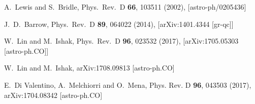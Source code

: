 \documentclass[superscriptaddress,oneolumn,secnumarabic,
amssymb,amsmath,nobibnotes,aps,prd,showpacs,nofootinbib]{revtex4}%
\begin{document}
\begin{thebibliography}{*}
  A.~Lewis and S.~Bridle,
  Phys.\ Rev.\ D {\bf 66}, 103511 (2002),
  [astro-ph/0205436]

  J.~D.~Barrow,
  Phys.\ Rev.\ D {\bf 89}, 064022 (2014),
  [arXiv:1401.4344 [gr-qc]]


  W.~Lin and M.~Ishak,
  Phys.\ Rev.\ D {\bf 96}, 023532 (2017),
  [arXiv:1705.05303 [astro-ph.CO]]



  W.~Lin and M.~Ishak,
  arXiv:1708.09813 [astro-ph.CO]

  E.~Di Valentino, A.~Melchiorri and O.~Mena, Phys. Rev. D \textbf{96}, 043503 (2017),
  arXiv:1704.08342 [astro-ph.CO]





\end{thebibliography}
\end{document}
